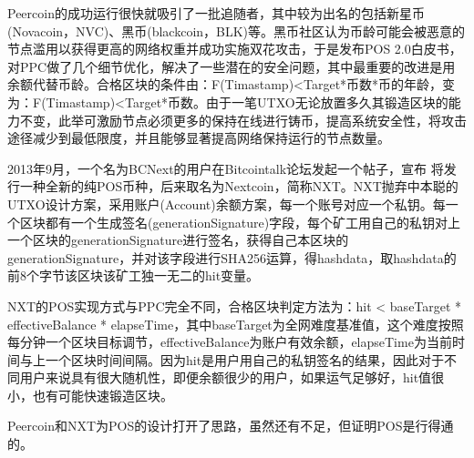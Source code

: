 \documentclass[a4paper,12pt]{article}
\begin{document}



Peercoin的成功运行很快就吸引了一批追随者，其中较为出名的包括新星币(Novacoin，NVC)、黑币(blackcoin，BLK)等。黑币社区认为币龄可能会被恶意的节点滥用以获得更高的网络权重并成功实施双花攻击，于是发布POS 2.0白皮书，对PPC做了几个细节优化，解决了一些潜在的安全问题，其中最重要的改进是用余额代替币龄。合格区块的条件由：F(Timastamp)<Target*币数*币的年龄，变为：F(Timastamp)<Target*币数。由于一笔UTXO无论放置多久其锻造区块的能力不变，此举可激励节点必须更多的保持在线进行铸币，提高系统安全性，将攻击途径减少到最低限度，并且能够显著提高网络保持运行的节点数量。

2013年9月，一个名为BCNext的用户在Bitcointalk论坛发起一个帖子，宣布 将发行一种全新的纯POS币种，后来取名为Nextcoin，简称NXT。NXT抛弃中本聪的UTXO设计方案，采用账户(Account)余额方案，每一个账号对应一个私钥。每一个区块都有一个生成签名(generationSignature)字段，每个矿工用自己的私钥对上一个区块的generationSignature进行签名，获得自己本区块的generationSignature，并对该字段进行SHA256运算，得hashdata，取hashdata的前8个字节该区块该矿工独一无二的hit变量。

NXT的POS实现方式与PPC完全不同，合格区块判定方法为：hit < baseTarget * effectiveBalance * elapseTime，其中baseTarget为全网难度基准值，这个难度按照每分钟一个区块目标调节，effectiveBalance为账户有效余额，elapseTime为当前时间与上一个区块时间间隔。因为hit是用户用自己的私钥签名的结果，因此对于不同用户来说具有很大随机性，即便余额很少的用户，如果运气足够好，hit值很小，也有可能快速锻造区块。

Peercoin和NXT为POS的设计打开了思路，虽然还有不足，但证明POS是行得通的。

\end{document}
